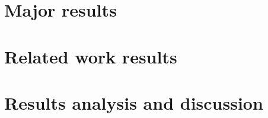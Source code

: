 

\section{Major results}
    \label{sec:major_results}
    

\section{Related work results}
    \label{sec:related_work_results}
    

\section{Results analysis and discussion}
    \label{sec:results_analysis_discussion}
    